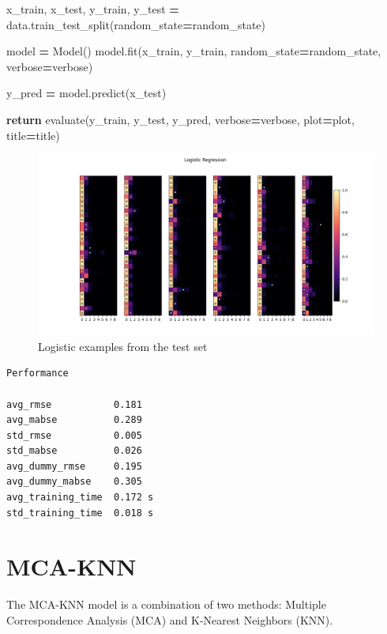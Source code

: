 \documentclass[
]{article}
\newenvironment{Shaded}{\begin{snugshade}}{\end{snugshade}}
\newcommand{\ControlFlowTok}[1]{\textcolor[rgb]{0.13,0.29,0.53}{\textbf{#1}}}
\newcommand{\NormalTok}[1]{#1}
\newcommand{\OperatorTok}[1]{\textcolor[rgb]{0.81,0.36,0.00}{\textbf{#1}}}
\begin{document}
\begin{Shaded}
\begin{Highlighting}[]
\NormalTok{    x\_train, x\_test, y\_train, y\_test }\OperatorTok{=}\NormalTok{ data.train\_test\_split(random\_state}\OperatorTok{=}\NormalTok{random\_state)}

\NormalTok{    model }\OperatorTok{=}\NormalTok{ Model()}
\NormalTok{    model.fit(x\_train, y\_train, random\_state}\OperatorTok{=}\NormalTok{random\_state, verbose}\OperatorTok{=}\NormalTok{verbose)}

\NormalTok{    y\_pred }\OperatorTok{=}\NormalTok{ model.predict(x\_test)}

    \ControlFlowTok{return}\NormalTok{ evaluate(y\_train, y\_test, y\_pred, verbose}\OperatorTok{=}\NormalTok{verbose, plot}\OperatorTok{=}\NormalTok{plot, title}\OperatorTok{=}\NormalTok{title)}
\end{Highlighting}
\end{Shaded}

\begin{figure}
\centering
\includegraphics{figures/logistic_regression.png}
\caption{Logistic examples from the test set}
\end{figure}

\begin{verbatim}
Performance

avg_rmse           0.181
avg_mabse          0.289
std_rmse           0.005
std_mabse          0.026
avg_dummy_rmse     0.195
avg_dummy_mabse    0.305
avg_training_time  0.172 s
std_training_time  0.018 s
\end{verbatim}

\section{MCA-KNN}\label{mca-knn}

The MCA-KNN model is a combination of two methods: Multiple
Correspondence Analysis (MCA) and K-Nearest Neighbors (KNN).
\end{document}
